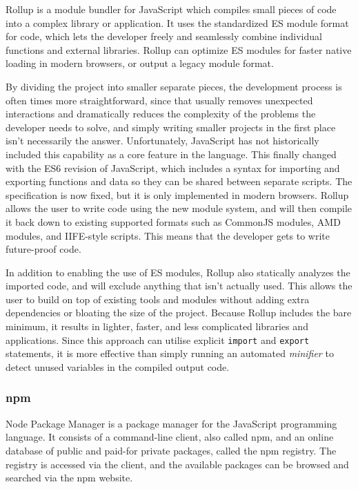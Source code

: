 \documentclass[english,bachelors,forcepolishlogotype]{wizthesis}
\newcommand{\paraphrase}[1]{#1}
\begin{document}
\paraphrase{Rollup \cite{rollup} is a module bundler for JavaScript which
compiles small pieces of code into a complex library or application. It uses the
standardized ES module format for code, which lets the developer freely and
seamlessly combine individual functions and external libraries. Rollup can
optimize ES modules for faster native loading in modern browsers, or output a
legacy module format.

By dividing the project into smaller separate pieces, the development process is
often times more straightforward, since that usually removes unexpected
interactions and dramatically reduces the complexity of the problems the
developer needs to solve, and simply writing smaller projects in the first place
isn't necessarily the answer. Unfortunately, JavaScript has not historically
included this capability as a core feature in the language. This finally changed
with the ES6 revision of JavaScript, which includes a syntax for importing and
exporting functions and data so they can be shared between separate scripts. The
specification is now fixed, but it is only implemented in modern browsers.
Rollup allows the user to write code using the new module system, and will then
compile it back down to existing supported formats such as CommonJS modules, AMD
modules, and IIFE-style scripts. This means that the developer gets to write
future-proof code.

In addition to enabling the use of ES modules, Rollup also statically analyzes
the imported code, and will exclude anything that isn't actually used. This
allows the user to build on top of existing tools and modules without adding
extra dependencies or bloating the size of the project. Because Rollup includes
the bare minimum, it results in lighter, faster, and less complicated libraries
and applications. Since this approach can utilise explicit \texttt{import} and
\texttt{export} statements, it is more effective than simply running an
automated \emph{minifier} to detect unused variables in the compiled output
code.}

\subsubsection*{npm}

\paraphrase{Node Package Manager \cite{npm} is a package manager for the
JavaScript programming language. It consists of a command-line client, also
called npm, and an online database of public and paid-for private packages,
called the npm registry. The registry is accessed via the client, and the
available packages can be browsed and searched via the npm website.}
\end{document}
